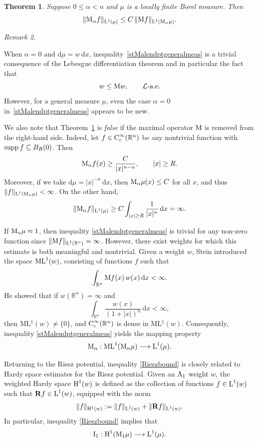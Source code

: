 \documentclass[11pt, a4paper, reqno]{amsart}
\newcommand{\R}{\mathbb R}
\newcommand{\al}{\alpha}
\newcommand{\dx}{\,{\mathrm dx}}
\newcommand{\Lup}{\textup{L}}
\newcommand{\Con}{\textup{C}}
\newcommand{\Har}{\textup{H}}
\DeclareMathOperator{\supp}{\textup{supp}}
\newtheorem{theorem}{Theorem}[section]
\theoremstyle{definition}
\theoremstyle{remark}
\newtheorem{remark}[theorem]{Remark}
\begin{document}
\begin{theorem} \label{MalMendpt}
Suppose $0 \le \alpha < n$ and $\mu$ is a locally finite Borel measure. Then
\begin{equation}\label{stMalendptgeneralmeas}
\|\textup{M}_\alpha f\|_{\Lup^{1}(\mu)} \le C\,\|\textup{M}f\|_{\Lup^1(\textup{M}_\alpha \mu)}.
\end{equation}
\end{theorem}
\begin{remark}\label{Malrem}

When $\alpha=0$ and $\mathrm{d}\mu = w\,\mathrm{d}x$, inequality~\eqref{stMalendptgeneralmeas} is a trivial consequence of the Lebesgue differentiation theorem and in particular the fact that
$$w\leq \textup Mw, \qquad \mathcal L \text{-a.e.}$$ 
However, for a general measure $\mu$, even the case $\alpha=0$ in~\eqref{stMalendptgeneralmeas} appears to be new.

We also note that Theorem~\ref{MalMendpt} is \emph{false} if the maximal operator $\textup{M}$ is removed from the right-hand side. Indeed, let $f\in \Con_c^\infty(\R^n)$ be any nontrivial function with $\supp f\subseteq B_R(0)$. Then
\[
\textup{M}_\alpha f(x)\geq \frac{C}{|x|^{n-\alpha}}, \qquad |x|\geq R.
\]
Moreover, if we take $\mathrm{d}\mu = |x|^{-\alpha}\,\mathrm{d}x$, then $\textup{M}_\alpha \mu(x)\leq C$ for all $x$, and thus
$\|f\|_{\Lup^1(\textup{M}_\alpha\mu)}<\infty$. On the other hand,
\[
\|\textup{M}_\alpha f\|_{\Lup^1(\mu)}
\geq
C\int_{|x|\geq R}\frac{1}{|x|^n}\,\mathrm{d}x
=
\infty.
\]

If $\textup{M}_\al\mu\approx 1$, then inequality \eqref{stMalendptgeneralmeas} is trivial for any non-zero function since $\|\textup{M}f\|_{\Lup^1(\R^n)}=\infty$.  However, there
exist weights for which this estimate is both meaningful and nontrivial. Given a weight $w$, Stein
\cite{St} introduced the space $\textup{M}\Lup^1(w)$, consisting of functions $f$ such that 
\[
\int_{\R^n} \textup{M}f(x)\, w(x)\dx < \infty.
\]
He showed that if $w(\R^n)=\infty$ and
\[
\int_{\R^n} \frac{w(x)}{(1+|x|)^n}\dx < \infty,
\]
then ML$^1(w)\neq\{0\}$, and $\Con_c^\infty(\R^n)$ is dense in
ML$^1(w)$. Consequently, inequality \eqref{stMalendptgeneralmeas} yields the
mapping property
\[
\textup{M}_\alpha : \textup{M}\Lup^1(\textup{M}_\alpha \mu) \longrightarrow \Lup^1(\mu).
\]
\end{remark}



Returning to the Riesz potential, inequality \eqref{Rieszbound} is closely related to Hardy space estimates for the
Riesz potential. Given an $\textup{A}_1$ weight $w$, the weighted Hardy space $\Har^1(w)$
is defined as the collection of functions $f \in \Lup^1(w)$ such that
$\mathbf R f \in \Lup^1(w)$, equipped with the norm
\[
\|f\|_{\Har^1(w)} := \|f\|_{\Lup^1(w)} + \|\mathbf R f\|_{\Lup^1(w)}.
\]
In particular, inequality \eqref{Rieszbound} implies that
\[
\textup{I}_1 : \Har^1(\textup{M}_1\mu) \longrightarrow \Lup^1(\mu).
\]
\end{document}
